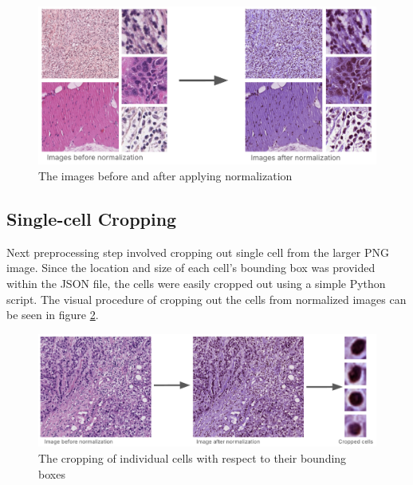 \begin{figure}[H]
    \begin{centering}
    \includegraphics[width=14cm]{assets/images/work-normalization.png}
    \par\end{centering}
    \caption{The images before and after applying normalization}
    \label{fig:work-norm}
\end{figure}

\subsection{Single-cell Cropping}
Next preprocessing step involved cropping out single cell from the larger PNG image. Since the location and size of each cell's bounding box was provided within the JSON file, the cells were easily cropped out using a simple Python script. The visual procedure of cropping out the cells from normalized images can be seen in figure \ref{fig:work-cell-crop}.

\begin{figure}[H]
    \begin{centering}
    \includegraphics[width=14cm]{assets/images/work-cell-cropping.png}
    \par\end{centering}
    \caption{The cropping of individual cells with respect to their bounding boxes}
    \label{fig:work-cell-crop}
\end{figure}

